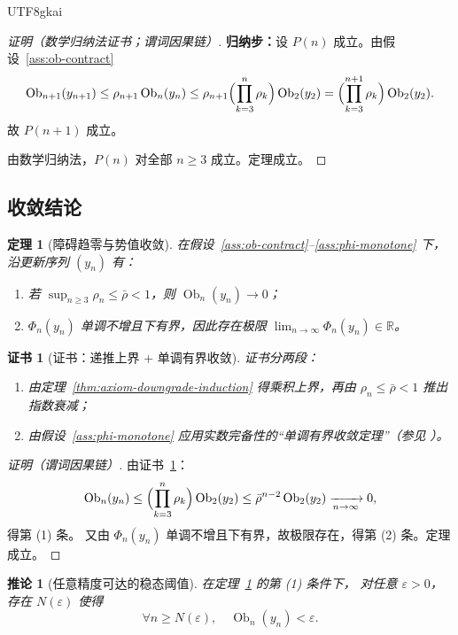 \documentclass[12pt]{article}
\newtheorem{theorem}{定理}[section]
\newtheorem{corollary}{推论}[section]
\newtheorem{Certificate}{证书}[section]
\newcommand{\Ob}{\operatorname{Ob}}
\begin{document}
\begin{CJK*}{UTF8}{gkai}
\begin{proof}[证明（数学归纳法证书；谓词因果链）]
\textbf{归纳步：}设 $P(n)$ 成立。由假设~\ref{ass:ob-contract}
\[
\Ob_{n+1}(y_{n+1})\le\rho_{n+1}\Ob_n(y_n)
\le
\rho_{n+1}\Bigl(\prod_{k=3}^{n}\rho_k\Bigr)\Ob_2(y_2)
=\Bigl(\prod_{k=3}^{n+1}\rho_k\Bigr)\Ob_2(y_2).
\]
故 $P(n+1)$ 成立。

由数学归纳法，$P(n)$ 对全部 $n\ge3$ 成立。定理成立。
\end{proof}

\subsection{收敛结论}

\begin{theorem}[障碍趋零与势值收敛]\label{thm:conditional-conv}
在假设~\ref{ass:ob-contract}--\ref{ass:phi-monotone} 下，沿更新序列 $(y_n)$ 有：
\begin{enumerate}
\item 若 $\sup_{n\ge3}\rho_n\le\bar\rho<1$，则 $\Ob_n(y_n)\to0$；
\item $\Phi_n(y_n)$ 单调不增且下有界，因此存在极限
\(
\lim_{n\to\infty}\Phi_n(y_n)\in\mathbb R
\)。
\end{enumerate}
\end{theorem}

\begin{Certificate}[证书：递推上界 + 单调有界收敛]\label{cert:conditional-conv}
证书分两段：
\begin{enumerate}
\item 由定理~\ref{thm:axiom-downgrade-induction} 得乘积上界，再由
\(
\rho_n\le\bar\rho<1
\)
推出指数衰减；
\item 由假设~\ref{ass:phi-monotone} 应用实数完备性的“单调有界收敛定理”（参见 \cite{Rudin1976}）。
\end{enumerate}
\end{Certificate}

\begin{proof}[证明（谓词因果链）]
由证书~\ref{cert:conditional-conv}：
\[
\Ob_n(y_n)
\le
\Bigl(\prod_{k=3}^{n}\rho_k\Bigr)\Ob_2(y_2)
\le
\bar\rho^{n-2}\Ob_2(y_2)
\xrightarrow[n\to\infty]{}0,
\]
得第 (1) 条。
又由
\(
\Phi_n(y_n)
\)
单调不增且下有界，故极限存在，得第 (2) 条。定理成立。
\end{proof}

\begin{corollary}[任意精度可达的稳态阈值]\label{cor:epsilon-stability}
在定理~\ref{thm:conditional-conv} 的第 (1) 条件下，
对任意 $\varepsilon>0$，存在 $N(\varepsilon)$ 使得
\[
\forall n\ge N(\varepsilon),\quad \Ob_n(y_n)<\varepsilon.
\]
\end{corollary}


\end{CJK*}
\end{document}
